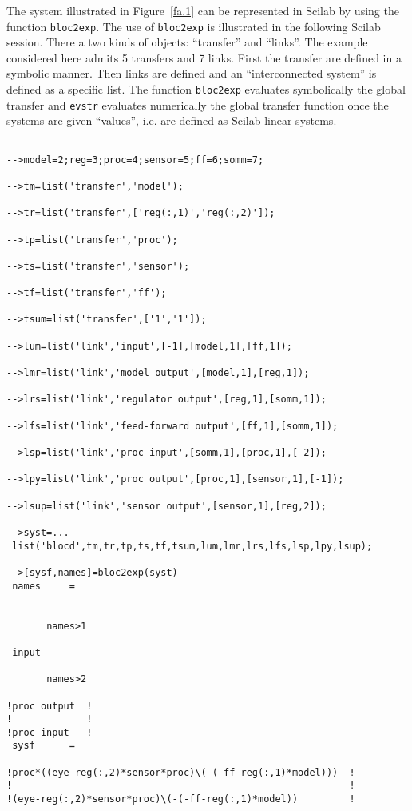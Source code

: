 	The system illustrated in Figure~\ref{fa.1} can
be represented in Scilab by using the function {\tt bloc2exp}.
The use of {\tt bloc2exp} is illustrated in the following Scilab
session.
There a two kinds of objects: ``transfer'' and ``links''. The example
considered here admits 5 transfers and 7 links.
First the transfer are defined in a symbolic manner. Then links
are defined and an ``interconnected system'' is defined as
a specific list. The function {\tt bloc2exp} evaluates symbolically
the global transfer and {\tt evstr} evaluates numerically
the global transfer function once the systems are given ``values'', i.e.
are defined as Scilab linear systems.
%
\begin{verbatim}
 
-->model=2;reg=3;proc=4;sensor=5;ff=6;somm=7;
 
-->tm=list('transfer','model');
 
-->tr=list('transfer',['reg(:,1)','reg(:,2)']);
 
-->tp=list('transfer','proc');
 
-->ts=list('transfer','sensor');
 
-->tf=list('transfer','ff');
 
-->tsum=list('transfer',['1','1']);
 
-->lum=list('link','input',[-1],[model,1],[ff,1]);
 
-->lmr=list('link','model output',[model,1],[reg,1]);
 
-->lrs=list('link','regulator output',[reg,1],[somm,1]);
 
-->lfs=list('link','feed-forward output',[ff,1],[somm,1]);
 
-->lsp=list('link','proc input',[somm,1],[proc,1],[-2]);
 
-->lpy=list('link','proc output',[proc,1],[sensor,1],[-1]);
 
-->lsup=list('link','sensor output',[sensor,1],[reg,2]);
 
-->syst=...
 list('blocd',tm,tr,tp,ts,tf,tsum,lum,lmr,lrs,lfs,lsp,lpy,lsup);
 
-->[sysf,names]=bloc2exp(syst)
 names     =
 
 
       names>1
 
 input   
 
       names>2
 
!proc output  !
!             !
!proc input   !
 sysf      =
 
!proc*((eye-reg(:,2)*sensor*proc)\(-(-ff-reg(:,1)*model)))  !
!                                                           !
!(eye-reg(:,2)*sensor*proc)\(-(-ff-reg(:,1)*model))         !
\end{verbatim}
